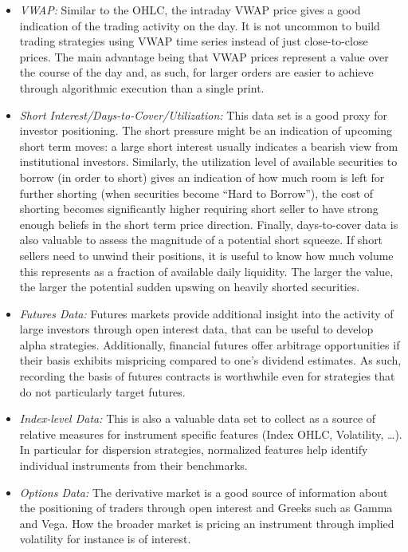 \begin{itemize}
\item \emph{VWAP:} Similar to the OHLC, the intraday VWAP price gives a good indication of the trading activity on the day. It is not uncommon to build trading strategies using VWAP time series instead of just close-to-close prices. The main advantage being that VWAP prices represent a value over the course of the day and, as such, for larger orders are easier to achieve through algorithmic execution than a single print.


\item \emph{Short Interest/Days-to-Cover/Utilization:} This data set is a good proxy for investor positioning. The short pressure might be an indication of upcoming short term moves: a large short interest usually indicates a bearish view from institutional investors. Similarly, the utilization level of available securities to borrow (in order to short) gives an indication of how much room is left for further shorting (when securities become ``Hard to Borrow''), the cost of shorting becomes significantly higher requiring short seller to have strong enough beliefs in the short term price direction. Finally, days-to-cover data is also valuable to assess the magnitude of a potential short squeeze. If short sellers need to unwind their positions, it is useful to know how much volume this represents as a fraction of available daily liquidity. The larger the value, the larger the potential sudden upswing on heavily shorted securities.


\item \emph{Futures Data:} Futures markets provide additional insight into the activity of large investors through open interest data, that can be useful to develop alpha strategies. Additionally, financial futures offer arbitrage opportunities if their basis exhibits mispricing compared to one's dividend estimates. As such, recording the basis of futures contracts is worthwhile even for strategies that do not particularly target futures.


\item \emph{Index-level Data:} This is also a valuable data set to collect as a source of relative measures for instrument specific features (Index OHLC, Volatility, \dots). In particular for dispersion strategies, normalized features help identify individual instruments from their benchmarks. 


\item \emph{Options Data:} The derivative market is a good source of information about the positioning of traders through open interest and Greeks such as Gamma and Vega. How the broader market is pricing an instrument through implied volatility for instance is of interest.



\end{itemize}
